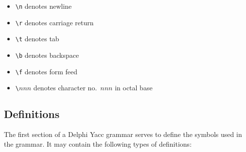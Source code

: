 \documentclass{article}
\begin{document}
\begin{itemize}
   \item \verb"\n"     denotes newline
   \item \verb"\r"     denotes carriage return
   \item \verb"\t"     denotes tab
   \item \verb"\b"     denotes backspace
   \item \verb"\f"     denotes form feed
   \item \verb"\"$nnn$ denotes character no.\ $nnn$ in octal base
\end{itemize}

\subsection{Definitions}

The first section of a Delphi Yacc grammar serves to define the symbols used in
the grammar. It may contain the following types of definitions:
\end{document}
